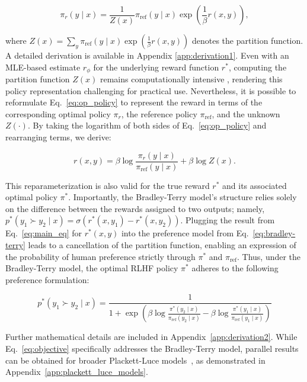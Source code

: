\begin{equation}\label{eq:op_policy}
    \pi_r(y\mid x) = \frac{1}{Z(x)}\pi_\text{ref}(y\mid x)\exp\left(\frac{1}{\beta}r(x, y)\right),
\end{equation}

where $Z(x) =\sum_{y}\pi_\text{ref}(y\mid x)\exp\left(\frac{1}{\beta}r(x, y)\right)$ denotes the partition function. A detailed derivation is available in Appendix \ref{app:derivation1}. Even with an MLE-based estimate $r_{\phi}$ for the underlying reward function $r^*$, computing the partition function $Z(x)$ remains computationally intensive \citep{korbak2022reinforcement, go2023aligning}, rendering this policy representation challenging for practical use. Nevertheless, it is possible to reformulate Eq.~\ref{eq:op_policy} to represent the reward in terms of the corresponding optimal policy $\pi_r$, the reference policy $\pi_\text{ref}$, and the unknown $Z(\cdot)$. By taking the logarithm of both sides of Eq.~\ref{eq:op_policy} and rearranging terms, we derive:

\begin{equation}\label{eq:main_eq}
    r(x,y) =\beta \log \frac{\pi_r(y\mid x)}{\pi_\text{ref}(y\mid x)} + \beta \log Z(x).
\end{equation}

This reparameterization is also valid for the true reward $r^*$ and its associated optimal policy $\pi^*$. Importantly, the Bradley-Terry model’s structure relies solely on the difference between the rewards assigned to two outputs; namely, ${p^*(y_1 \succ y_2 \mid x) = \sigma(r^*(x, y_1) - r^*(x, y_2))}$. Plugging the result from Eq.~\ref{eq:main_eq} for $r^*(x,y)$ into the preference model from Eq.~\ref{eq:bradley-terry} leads to a cancellation of the partition function, enabling an expression of the probability of human preference strictly through $\pi^*$ and $\pi_\text{ref}$. Thus, under the Bradley-Terry model, the optimal RLHF policy $\pi^*$ adheres to the following preference formulation:

\begin{equation}\label{eq:objective}
    p^*(y_1\succ y_2 \mid x)=\frac{1}{1 + \exp\left(\beta \log \frac{\pi^*(y_2\mid x)}{\pi_\text{ref}(y_2\mid x)} - \beta \log \frac{\pi^*(y_1\mid x)}{\pi_\text{ref}(y_1\mid x)}\right)}
\end{equation}

Further mathematical details are included in Appendix~\ref{app:derivation2}. While Eq.~\ref{eq:objective} specifically addresses the Bradley-Terry model, parallel results can be obtained for broader Plackett-Luce models~\citep{plackett1975analysis, luce2012individual}, as demonstrated in Appendix~\ref{app:plackett_luce_models}.


